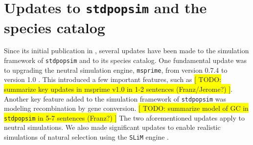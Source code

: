 \documentclass[hidelinks]{article}
\newcommand{\stdpopsim}{\texttt{stdpopsim}\xspace}
\begin{document}
%
%
%





\hypertarget{sec3}{%
	\section*{Updates to \texttt{\stdpopsim} and the species catalog}\label{sec:expanded-catalog}}

Since its initial publication in \cite{Adrion2020}, several updates have been made to  the simulation framework of \texttt{\stdpopsim} and to its species catalog. One fundamental update was to upgrading the neutral simulation engine, \texttt{msprime}, from version 0.7.4 to version 1.0 \citep{Baumdicker2022}. This introduced a few important features, such as %
\colorbox{yellow}{[ TODO: summarize key updates in msprime v1.0 in 1-2 sentences (Franz/Jerome?) ]}.
%
Another key feature added to the simulation framework of \texttt{\stdpopsim} was modeling recombination by gene conversion. %
\colorbox{yellow}{[ TODO: summarize model of GC in \stdpopsim in 5-7 sentences (Franz?) ]}
%
The two aforementioned updates apply to neutral simulations. We also made significant updates to enable realistic simulations of natural selection using the \texttt{SLiM} engine \citep{Haller2019}. %
\end{document}
